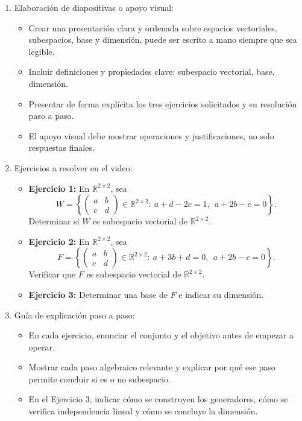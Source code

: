 \documentclass[a4,11pt]{aleph-notas}
\begin{document}
\begin{enumerate}
    \item {Elaboración de diapositivas o apoyo visual:}
    \begin{itemize}
        \item Crear una presentación clara y ordenada sobre espacios vectoriales, subespacios, base y dimensión, puede ser escrito a mano siempre que sea legible.
        \item Incluir definiciones y propiedades clave: subespacio vectorial, base, dimensión.
        \item Presentar de forma explícita los tres ejercicios solicitados y su resolución paso a paso.
        \item El apoyo visual debe mostrar operaciones y justificaciones, no solo respuestas finales.
    \end{itemize}

    \item {Ejercicios a resolver en el video:}
    \begin{itemize}
        \item \textbf{Ejercicio 1:} En $\mathbb{R}^{2\times 2}$, sea
        \[
        W=\left\{\begin{pmatrix}a&b\\c&d\end{pmatrix}\in\mathbb{R}^{2\times2}:\ a+d-2c=1,\ \ a+2b-c=0\right\}.
        \]
        Determinar si $W$ es subespacio vectorial de $\mathbb{R}^{2\times2}$.

        \item \textbf{Ejercicio 2:} En $\mathbb{R}^{2\times 2}$, sea
        \[
        F=\left\{\begin{pmatrix}a&b\\c&d\end{pmatrix}\in\mathbb{R}^{2\times2}:\ a+3b+d=0,\ \ a+2b-c=0\right\}.
        \]
            Verificar que $F$ es subespacio vectorial de $\mathbb{R}^{2\times2}$.
        \item \textbf{Ejercicio 3:}  Determinar una base de $F$ e indicar su dimensión.
    \end{itemize}

    \item {Guía de explicación paso a paso:}
    \begin{itemize}
        \item En cada ejercicio, enunciar el conjunto y el objetivo antes de empezar a operar.
        \item Mostrar cada paso algebraico relevante y explicar por qué ese paso permite concluir si es o no subespacio.
        \item En el Ejercicio 3, indicar cómo se construyen los generadores, cómo se verifica independencia lineal y cómo se concluye la dimensión.
    \end{itemize}


\end{enumerate}
\end{document}

